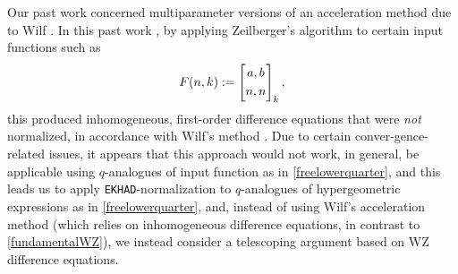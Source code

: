 \documentclass[12pt]{article}
\begin{document}
 Our past work \cite{CampbellLevrie2024} concerned multiparameter versions of an acceleration method due to Wilf 
 \cite{Wilf1999}.     
 In   this     past work \cite{CampbellLevrie2024}, by applying Zeilberger's algorithm
 to certain input functions such as 
 \begin{equation}\label{freelowerquarter}
 F(n, k) := \left[ \begin{matrix} 
 a, b \vspace{1mm} \\ 
 n, n
 \end{matrix} \right]_{k}, 
\end{equation}
 this produced inhomogeneous, first-order difference equations that were \emph{not}
 normalized, in accordance with Wilf's method \cite{Wilf1999}. 
 Due to certain conver-gence-related issues, it appears that this approach 
 would not work, in general, be applicable using $q$-analogues of input function as in 
 \eqref{freelowerquarter}, 
 and this leads us to apply {\tt EKHAD}-normalization to $q$-analogues of 
 hypergeometric expressions as in \eqref{freelowerquarter}, 
 and, instead of using Wilf's acceleration method (which relies on inhomogeneous difference equations, 
 in contrast to \eqref{fundamentalWZ}), we instead consider a telescoping argument 
 based on WZ difference equations. 
\end{document}
